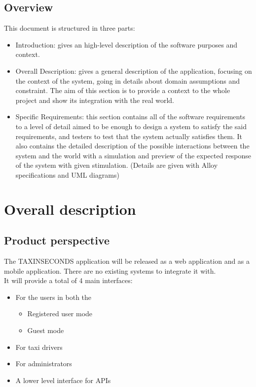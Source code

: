 \documentclass{article}
\begin{document}
\subsection{Overview}
This document is structured in three parts:
\begin{itemize}
	\item Introduction: gives an high-level description of the software purposes and context.
	\item Overall Description: gives a general description of the application, focusing on the context of the system, going in details about domain assumptions and constraint. The aim of this section is to provide a context to the whole project and show its integration with the real world.
	\item Specific Requirements: this section contains all of the software requirements to a level of detail aimed to be enough to design a system to satisfy the said requirements, and testers to test that the system actually satisfies them. It also contains the detailed description of the possible interactions between the system and the world with a simulation and preview of the expected response of the system with given stimulation. (Details are given with Alloy specifications and UML diagrams)
\end{itemize}


\section{Overall description}
\subsection{Product perspective}
The TAXINSECONDS application will be released as a web application and as a mobile application. 
There are no existing systems to integrate it with. 
\\It will provide a total of 4 main interfaces:
\begin{itemize}
	\item For the users in both the
		\begin{itemize}
			\item Registered user mode
			\item Guest mode
		\end{itemize}
	\item For taxi drivers 
	\item For administrators
	\item A lower level interface for APIs
\end{itemize}
\end{document}
